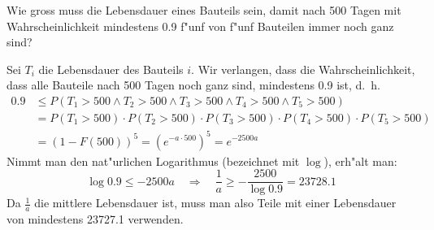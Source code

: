Wie gross muss die Lebensdauer eines Bauteils sein, damit nach 500
Tagen mit Wahrscheinlichkeit mindestens 0.9 f"unf von f"unf Bauteilen
immer noch ganz sind?

\begin{loesung}
Sei $T_i$ die Lebensdauer des Bauteils $i$. Wir verlangen, dass
die Wahrscheinlichkeit, dass alle Bauteile nach 500 Tagen noch
ganz sind, mindestens 0.9 ist, d.~h.
\begin{align*}
0.9
&\le
P(
T_1 > 500
\wedge
T_2 > 500
\wedge
T_3 > 500
\wedge
T_4 > 500
\wedge
T_5 > 500)
\\
&=
P(T_1 > 500)
\cdot
P(T_2 > 500)
\cdot
P(T_3 > 500)
\cdot
P(T_4 > 500)
\cdot
P(T_5 > 500)
\\
&=(1-F(500))^5=(e^{-a\cdot 500})^5=e^{-2500a}
\end{align*}
Nimmt man den nat"urlichen Logarithmus (bezeichnet mit $\log$),
erh"alt man:
\[
\log 0.9\le -2500 a\quad\Rightarrow\quad \frac1a \ge -\frac{2500}{\log 0.9}
=23728.1
\]
Da $\frac1a$ die mittlere Lebensdauer ist, muss man also Teile mit
einer Lebensdauer von mindestens 23727.1 verwenden.
\end{loesung}

